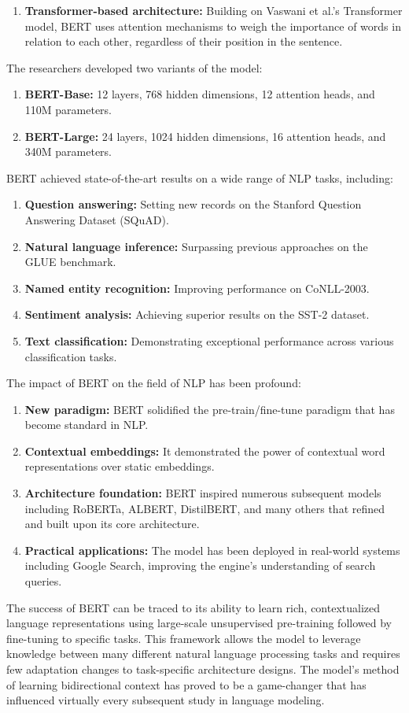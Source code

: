 \documentclass[conference]{IEEEtran}
\begin{document}
\begin{enumerate}
\begin{enumerate}
\item \textbf{Transformer-based architecture:} Building on Vaswani et al.'s Transformer model, BERT uses attention mechanisms to weigh the importance of words in relation to each other, regardless of their position in the sentence.
\end{enumerate}
The researchers developed two variants of the model:
\begin{enumerate}
\item \textbf{BERT-Base:} 12 layers, 768 hidden dimensions, 12 attention heads, and 110M parameters.
\item \textbf{BERT-Large:} 24 layers, 1024 hidden dimensions, 16 attention heads, and 340M parameters.
\end{enumerate}
BERT achieved state-of-the-art results on a wide range of NLP tasks, including:
\begin{enumerate}
\item \textbf{Question answering:} Setting new records on the Stanford Question Answering Dataset (SQuAD).
\item \textbf{Natural language inference:} Surpassing previous approaches on the GLUE benchmark.
\item \textbf{Named entity recognition:} Improving performance on CoNLL-2003.
\item \textbf{Sentiment analysis:} Achieving superior results on the SST-2 dataset.
\item \textbf{Text classification:} Demonstrating exceptional performance across various classification tasks.
\end{enumerate}
The impact of BERT on the field of NLP has been profound:
\begin{enumerate}
\item \textbf{New paradigm:} BERT solidified the pre-train/fine-tune paradigm that has become standard in NLP.
\item \textbf{Contextual embeddings:} It demonstrated the power of contextual word representations over static embeddings.
\item \textbf{Architecture foundation:} BERT inspired numerous subsequent models including RoBERTa, ALBERT, DistilBERT, and many others that refined and built upon its core architecture.
\item \textbf{Practical applications:} The model has been deployed in real-world systems including Google Search, improving the engine's understanding of search queries.
\end{enumerate}
The success of BERT can be traced to its ability to learn rich, contextualized language representations using large-scale unsupervised pre-training followed by fine-tuning to specific tasks. This framework allows the model to leverage knowledge between many different natural language processing tasks and requires few adaptation changes to task-specific architecture designs. The model's method of learning bidirectional context has proved to be a game-changer that has influenced virtually every subsequent study in language modeling.


\end{enumerate}
\end{document}
